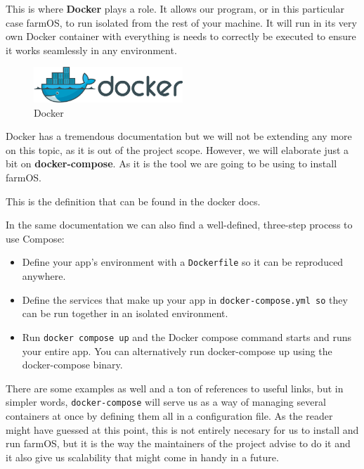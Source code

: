 \vspace{5mm}
This is where \textbf{Docker}\cite{docker} plays a role. It allows our program, or in this particular case farmOS, to run isolated from the rest of your machine. It will run in its very own Docker container with everything is needs to correctly be executed to ensure it works seamlessly in any environment.

\begin{figure}[H]
    \centering
    \includegraphics[width=0.5\textwidth]{fig/docker_logo.png}
        \caption{Docker}
    \label{fig:docker-logo}
\end{figure}

\vspace{7mm}
Docker has a tremendous documentation but we will not be extending any more on this topic, as it is out of the project scope. However, we will elaborate just a bit on \textbf{docker-compose}\cite{docker-compose}. As it is the tool we are going to be using to install farmOS.

This is the definition that can be found in the docker docs.


\vspace{5mm}
In the same documentation we can also find a well-defined, three-step process to use Compose:
\begin{itemize}
	\item Define your app’s environment with a \verb|Dockerfile|\cite{dockerfile} so it can be reproduced anywhere.
	\item Define the services that make up your app in \verb|docker-compose.yml so| they can be run together in an isolated environment.
	\item Run \verb|docker compose up| and the Docker compose command starts and runs your entire app. You can alternatively run docker-compose up using the docker-compose binary.
\end{itemize}

\vspace{7mm}
There are some examples as well and a ton of references to useful links, but in simpler words, \verb|docker-compose| will serve us as a way of managing several containers at once by defining them all in a configuration file. As the reader might have guessed at this point, this is not entirely necesary for us to install and run farmOS, but it is the way the maintainers of the project advise to do it and it also give us scalability that might come in handy in a future.


